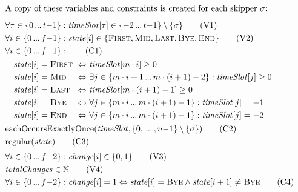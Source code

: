 \documentclass{llncs}
\newcommand{\timeSlot}{\mathit{timeSlot}}
\newcommand{\state}{\mathit{state}}
\newcommand{\change}{\mathit{change}}
\newcommand{\totalChanges}{\mathit{totalChanges}}
\newcommand{\FIRST}{\textnormal{\textsc{First}}}
\newcommand{\MID}{\textnormal{\textsc{Mid}}}
\newcommand{\LAST}{\textnormal{\textsc{Last}}}
\newcommand{\END}{\textnormal{\textsc{End}}}
\newcommand{\BYE}{\textnormal{\textsc{Bye}}}
\newcommand{\eachOccursExactlyOnce}{\mathrm{eachOccursExactlyOnce}}
\newcommand{\regular}{\mathrm{regular}}
\newcommand\nldots{\,\hbox to 0.8em{.\hss.\hss.}\,}
\begin{document}
\begin{figure}[p]
\setlength{\mathindent}{1em}
\setlength{\abovedisplayskip}{0pt}
\setlength{\belowdisplayskip}{0pt}
\setlength{\abovecaptionskip}{0pt}
\begin{framed}
\begin{align}
    \intertext{A copy of these variables and constraints is created for each skipper $\sigma$:\smallskip}
    &\forall \tau \in \{0 \nldots t{-}1\}: \timeSlot[{\tau}] \in \{{-}2 \nldots t{-}1\} \setminus \{\sigma\} \label{var:timeSlot} \tag{V1} \\
    &\forall i \in \{0 \nldots f{-}1\}: \state[{i}] \in \{\FIRST,\MID,\LAST,\BYE,\END\} \label{var:state} \tag{V2} \\
    &\forall i \in \{0 \nldots f{-}1\}: \label{C1} \tag{C1} \\
    &\begin{alignedat}{3}
    &\hspace*{1em} \state[{i}] = \FIRST &\ &\Leftrightarrow&&\ \timeSlot[{m \cdot i}] \geq 0 \\
    &\hspace*{1em} \state[{i}] = \MID   &\ &\Leftrightarrow&&\ \exists j \in \{m \cdot i + 1 \nldots m \cdot (i + 1) - 2\} : \timeSlot[{j}] \geq 0 \\
    &\hspace*{1em} \state[{i}] = \LAST  &\ &\Leftrightarrow&&\ \timeSlot[m \cdot (i + 1) - 1] \geq 0 \\
    &\hspace*{1em} \state[{i}] = \BYE   &\ &\Leftrightarrow&&\ \forall j \in \{m \cdot i \nldots m \cdot (i + 1) - 1\} : \timeSlot[j] = -1 \\
    &\hspace*{1em} \state[{i}] = \END   &\ &\Leftrightarrow&&\ \forall j \in \{m \cdot i \nldots m \cdot (i + 1) - 1\} : \timeSlot[j] = -2
    \end{alignedat} \nonumber \\
    &\eachOccursExactlyOnce(\timeSlot, \{0, \nldots, n{-}1\} \setminus \{\sigma\}) \label{C2} \tag{C2} \\
    & \regular(\state) \label{C3} \tag{C3} \\[0.1cm]
    & \forall i \in \{0 \nldots f{-}2\}: \change[{i}] \in \{0,1\} \label{V3} \tag{V3} \\
    & \totalChanges \in \mathbb{N} \label{V4} \tag{V4} \\
    & \forall i \in \{0 \nldots f{-}2\}: \change[{i}] = 1 \Leftrightarrow \state[{i}] = \BYE \wedge \state[{i + 1}] \neq \BYE \label {C4} \tag{C4} \\

\end{align}
\end{framed}
\end{figure}
\end{document}
